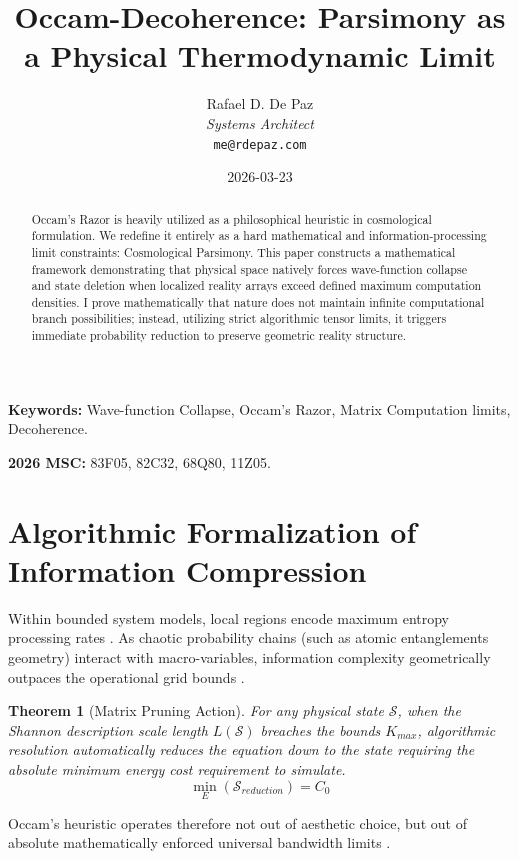 \documentclass[12pt, a4paper]{article}
\theoremstyle{plain}
\newtheorem{theorem}{Theorem}[section]
\theoremstyle{definition}
\begin{document}
\title{\textbf{Occam-Decoherence: Parsimony as a Physical Thermodynamic Limit}}
\author{Rafael D. De Paz \\ \textit{Systems Architect} \\ \texttt{me@rdepaz.com}}
\date{2026-03-23}
\maketitle

\begin{abstract}
Occam's Razor is heavily utilized as a philosophical heuristic in cosmological formulation. We redefine it entirely as a hard mathematical and information-processing limit constraints: Cosmological Parsimony. This paper constructs a mathematical framework demonstrating that physical space natively forces wave-function collapse and state deletion when localized reality arrays exceed defined maximum computation densities. I prove mathematically that nature does not maintain infinite computational branch possibilities; instead, utilizing strict algorithmic tensor limits, it triggers immediate probability reduction to preserve geometric reality structure.
\end{abstract}

\vspace{0.5em}
\noindent\textbf{Keywords:} Wave-function Collapse, Occam's Razor, Matrix Computation limits, Decoherence.

\vspace{0.5em}
\noindent\textbf{2026 MSC:} 83F05, 82C32, 68Q80, 11Z05.

\section{Algorithmic Formalization of Information Compression}
Within bounded system models, local regions encode maximum entropy processing rates \cite{shannon1948mathematical}. As chaotic probability chains (such as atomic entanglements geometry) interact with macro-variables, information complexity geometrically outpaces the operational grid bounds \cite{lamport1978time}.

\begin{theorem} [Matrix Pruning Action]
For any physical state $\mathcal{S}$, when the Shannon description scale length $L(\mathcal{S})$ breaches the bounds $K_{max}$, algorithmic resolution automatically reduces the equation down to the state requiring the absolute minimum energy cost requirement to simulate.
\begin{equation}
    \min_{E}( \mathcal{S}_{reduction} ) = C_{0}
\end{equation}
\end{theorem}
Occam's heuristic operates therefore not out of aesthetic choice, but out of absolute mathematically enforced universal bandwidth limits \cite{turing1936computable}.
\end{document}
